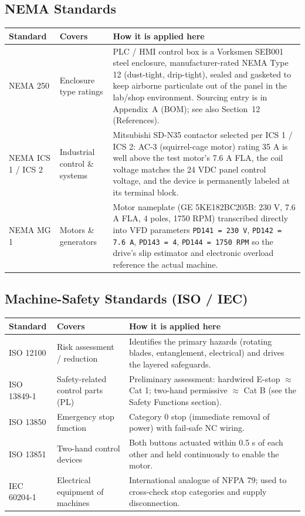 \documentclass[hidelinks,12pt]{article}
\begin{document}
\subsection{NEMA Standards}
\label{subsec:nema}
\renewcommand{\arraystretch}{1.3}
\noindent\begin{tabularx}{\textwidth}{|p{2.5cm}|p{3.0cm}|X|}
\hline
\rowcolor{PSUgreen!12}\textbf{Standard} & \textbf{Covers} & \textbf{How it is applied here} \\
\hline
NEMA 250 & Enclosure type ratings & PLC / HMI control box is a Vorksmen SEB001 steel enclosure, manufacturer-rated NEMA Type 12 (dust-tight, drip-tight), sealed and gasketed to keep airborne particulate out of the panel in the lab/shop environment. Sourcing entry is in Appendix~A (BOM); see also Section~12 (References). \\ \hline
NEMA ICS 1 / ICS 2 & Industrial control \& systems & Mitsubishi SD-N35 contactor selected per ICS 1 / ICS 2: AC-3 (squirrel-cage motor) rating 35 A is well above the test motor's 7.6 A FLA, the coil voltage matches the 24 VDC panel control voltage, and the device is permanently labeled at its terminal block. \\ \hline
NEMA MG 1 & Motors \& generators & Motor nameplate (GE 5KE182BC205B: 230 V, 7.6 A FLA, 4 poles, 1750 RPM) transcribed directly into VFD parameters \texttt{PD141 = 230 V}, \texttt{PD142 = 7.6 A}, \texttt{PD143 = 4}, \texttt{PD144 = 1750 RPM} so the drive's slip estimator and electronic overload reference the actual machine. \\
\hline
\end{tabularx}
\renewcommand{\arraystretch}{1.0}

\subsection{Machine-Safety Standards (ISO / IEC)}
\renewcommand{\arraystretch}{1.3}
\noindent\begin{tabularx}{\textwidth}{|p{2.5cm}|p{3.0cm}|X|}
\hline
\rowcolor{PSUgreen!12}\textbf{Standard} & \textbf{Covers} & \textbf{How it is applied here} \\
\hline
ISO 12100 & Risk assessment / reduction & Identifies the primary hazards (rotating blades, entanglement, electrical) and drives the layered safeguards. \\ \hline
ISO 13849-1 & Safety-related control parts (PL) & Preliminary assessment: hardwired E-stop $\approx$ Cat 1; two-hand permissive $\approx$ Cat B (see the Safety Functions section). \\ \hline
ISO 13850 & Emergency stop function & Category 0 stop (immediate removal of power) with fail-safe NC wiring. \\ \hline
ISO 13851 & Two-hand control devices & Both buttons actuated within 0.5 s of each other and held continuously to enable the motor. \\ \hline
IEC 60204-1 & Electrical equipment of machines & International analogue of NFPA 79; used to cross-check stop categories and supply disconnection. \\
\hline
\end{tabularx}
\renewcommand{\arraystretch}{1.0}
\end{document}
